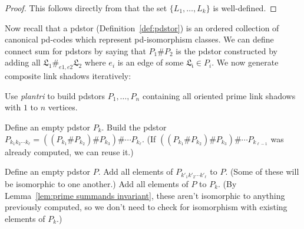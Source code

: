 \documentclass[amsmath,secnumarabic,amssymb,floatfix,nofootinbib,nobibnotes,letterpaper,11pt,tightenlines,showkeys]{revtex4}
\theoremstyle{definition}
\let\mgp=\marginpar \marginparwidth18mm \marginparsep1mm
\def\marginpar#1{\mgp{\raggedright\tiny #1}}
\let\lbl=\label
\def\label#1{\lbl{#1}\ifinner\else\marginpar{\ref{#1} #1}\ignorespaces\fi}
\begin{document}
\begin{proof} This follows directly from that the set $\{L_1, \dots, L_k\}$ is well-defined. \end{proof}

Now recall that a pdstor (Definition~\ref{def:pdstor}) is an ordered collection of canonical pd-codes which represent pd-isomorphism classes. We can define connect sum for pdstors by saying that $P_1 \# P_2$ is the pdstor constructed by adding all $\mathfrak{L_1} \#_{e1,e2} \mathfrak{L_2}$ where $e_i$ is an edge of some $\mathfrak{L_i} \in P_i$. We now generate composite link shadows iteratively:

\begin{algorithmic}

\State Use \emph{plantri} to build pdstors $P_1, \dots, P_n$ containing all oriented prime link shadows with $1$ to $n$ vertices.


 \State Define an empty pdstor $P_k$.
    \State  Build the pdstor $P_{k_1k_2\cdots k_\ell} = ((P_{k_1} \# P_{k_2}) \# P_{k_3}) \# \cdots P_{k_\ell}$.
    \State  (If $((P_{k_1} \# P_{k_2}) \# P_{k_3}) \# \cdots P_{k_{\ell-1}}$ was already computed, we can reuse it.)
 \EndFor

    \State Define an empty pdstor $P$.
       \State Add all elements of $P_{k'_1k'_2\cdots k'_\ell}$ to $P$.
      \State (Some of these will be isomorphic to one another.)
    \EndFor
    \State Add all elements of $P$ to $P_k$.
    \State (By Lemma~\ref{lem:prime summands invariant}, these aren't isomorphic to anything previously computed,
    \State so we don't need to check for isomorphism with existing elements of $P_k$.)
 \EndFor

\EndFor
\EndProcedure
\end{algorithmic}
\end{document}
